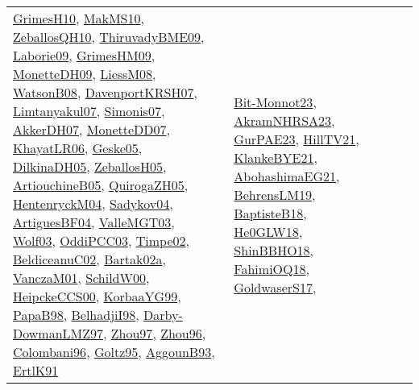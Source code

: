 {\begin{longtable}{lp{3cm}>{\raggedright}p{6cm}>{\raggedright}p{6cm}p{8cm}}
\href{papers/GrimesH10.pdf}{GrimesH10}\cite{GrimesH10}, \href{papers/MakMS10.pdf}{MakMS10}\cite{MakMS10}, \href{articles/ZeballosQH10.pdf}{ZeballosQH10}\cite{ZeballosQH10}, \href{papers/ThiruvadyBME09.pdf}{ThiruvadyBME09}\cite{ThiruvadyBME09}, \href{papers/Laborie09.pdf}{Laborie09}\cite{Laborie09}, \href{papers/GrimesHM09.pdf}{GrimesHM09}\cite{GrimesHM09}, \href{papers/MonetteDH09.pdf}{MonetteDH09}\cite{MonetteDH09}, \href{articles/LiessM08.pdf}{LiessM08}\cite{LiessM08}, \href{papers/WatsonB08.pdf}{WatsonB08}\cite{WatsonB08}, \href{papers/DavenportKRSH07.pdf}{DavenportKRSH07}\cite{DavenportKRSH07}, \href{papers/Limtanyakul07.pdf}{Limtanyakul07}\cite{Limtanyakul07}, \href{articles/Simonis07.pdf}{Simonis07}\cite{Simonis07}, \href{papers/AkkerDH07.pdf}{AkkerDH07}\cite{AkkerDH07}, \href{papers/MonetteDD07.pdf}{MonetteDD07}\cite{MonetteDD07}, \href{articles/KhayatLR06.pdf}{KhayatLR06}\cite{KhayatLR06}, \href{papers/Geske05.pdf}{Geske05}\cite{Geske05}, \href{papers/DilkinaDH05.pdf}{DilkinaDH05}\cite{DilkinaDH05}, \href{articles/ZeballosH05.pdf}{ZeballosH05}\cite{ZeballosH05}, \href{papers/ArtiouchineB05.pdf}{ArtiouchineB05}\cite{ArtiouchineB05}, \href{papers/QuirogaZH05.pdf}{QuirogaZH05}\cite{QuirogaZH05}, \href{papers/HentenryckM04.pdf}{HentenryckM04}\cite{HentenryckM04}, \href{papers/Sadykov04.pdf}{Sadykov04}\cite{Sadykov04}, \href{papers/ArtiguesBF04.pdf}{ArtiguesBF04}\cite{ArtiguesBF04}, \href{papers/ValleMGT03.pdf}{ValleMGT03}\cite{ValleMGT03}, \href{papers/Wolf03.pdf}{Wolf03}\cite{Wolf03}, \href{papers/OddiPCC03.pdf}{OddiPCC03}\cite{OddiPCC03}, \href{articles/Timpe02.pdf}{Timpe02}\cite{Timpe02}, \href{papers/BeldiceanuC02.pdf}{BeldiceanuC02}\cite{BeldiceanuC02}, \href{papers/Bartak02a.pdf}{Bartak02a}\cite{Bartak02a}, \href{papers/VanczaM01.pdf}{VanczaM01}\cite{VanczaM01}, \href{articles/SchildW00.pdf}{SchildW00}\cite{SchildW00}, \href{articles/HeipckeCCS00.pdf}{HeipckeCCS00}\cite{HeipckeCCS00}, \href{papers/KorbaaYG99.pdf}{KorbaaYG99}\cite{KorbaaYG99}, \href{articles/PapaB98.pdf}{PapaB98}\cite{PapaB98}, \href{articles/BelhadjiI98.pdf}{BelhadjiI98}\cite{BelhadjiI98}, \href{articles/Darby-DowmanLMZ97.pdf}{Darby-DowmanLMZ97}\cite{Darby-DowmanLMZ97}, \href{articles/Zhou97.pdf}{Zhou97}\cite{Zhou97}, \href{papers/Zhou96.pdf}{Zhou96}\cite{Zhou96}, \href{papers/Colombani96.pdf}{Colombani96}\cite{Colombani96}, \href{papers/Goltz95.pdf}{Goltz95}\cite{Goltz95}, \href{articles/AggounB93.pdf}{AggounB93}\cite{AggounB93}, \href{papers/ErtlK91.pdf}{ErtlK91}\cite{ErtlK91} & \href{papers/Bit-Monnot23.pdf}{Bit-Monnot23}\cite{Bit-Monnot23}, \href{articles/AkramNHRSA23.pdf}{AkramNHRSA23}\cite{AkramNHRSA23}, \href{articles/GurPAE23.pdf}{GurPAE23}\cite{GurPAE23}, \href{papers/HillTV21.pdf}{HillTV21}\cite{HillTV21}, \href{papers/KlankeBYE21.pdf}{KlankeBYE21}\cite{KlankeBYE21}, \href{articles/AbohashimaEG21.pdf}{AbohashimaEG21}\cite{AbohashimaEG21}, \href{papers/BehrensLM19.pdf}{BehrensLM19}\cite{BehrensLM19}, \href{articles/BaptisteB18.pdf}{BaptisteB18}\cite{BaptisteB18}, \href{papers/He0GLW18.pdf}{He0GLW18}\cite{He0GLW18}, \href{articles/ShinBBHO18.pdf}{ShinBBHO18}\cite{ShinBBHO18}, \href{articles/FahimiOQ18.pdf}{FahimiOQ18}\cite{FahimiOQ18}, \href{papers/GoldwaserS17.pdf}{GoldwaserS17}\cite{GoldwaserS17}, 
\end{longtable}}
